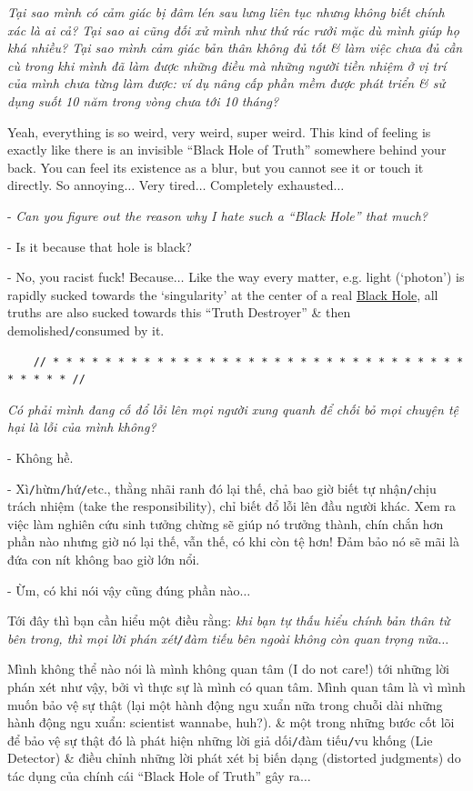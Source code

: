 \documentclass[12pt]{article}
\begin{document}
{\it Tại sao mình có cảm giác bị đâm lén sau lưng liên tục nhưng không biết chính xác là ai cả? Tại sao ai cũng đối xử mình như thứ rác rưởi mặc dù mình giúp họ khá nhiều? Tại sao mình cảm giác bản thân không đủ tốt \& làm việc chưa đủ cần cù trong khi mình đã làm được những điều mà những người tiền nhiệm ở vị trí của mình chưa từng làm được: ví dụ nâng cấp phần mềm được phát triển \& sử dụng suốt 10 năm trong vòng chưa tới 10 tháng?}

Yeah, everything is so weird, very weird, super weird. This kind of feeling is exactly like there is an invisible ``Black Hole of Truth'' somewhere behind your back. You can feel its existence as a blur, but you cannot see it or touch it directly. So annoying$\ldots$ Very tired$\ldots$ Completely exhausted$\ldots$

- {\it Can you figure out the reason why I hate such a ``Black Hole'' that much?}

- Is it because that hole is black?

- No, you racist fuck! Because$\ldots$ Like the way every matter, e.g. light (`photon') is rapidly sucked towards the `singularity' at the center of a real \href{https://en.wikipedia.org/wiki/Black_hole}{Black Hole}, all truths are also sucked towards this ``Truth Destroyer'' \& then demolished{\tt/}consumed by it.

\begin{verbatim}
	// * * * * * * * * * * * * * * * * * * * * * * * * * * * * * * * * * * * * * //
\end{verbatim}

\noindent
{} {\it Có phải mình đang cố đổ lỗi lên mọi người xung quanh để chối bỏ mọi chuyện tệ hại là lỗi của mình không?}

- Không hề.

- Xì{\tt/}hừm{\tt/}hứ{\tt/}etc., thằng nhãi ranh đó lại thế, chả bao giờ biết tự nhận{\tt/}chịu trách nhiệm (take the responsibility), chỉ biết đổ lỗi lên đầu người khác. Xem ra việc làm nghiên cứu sinh tưởng chừng sẽ giúp nó trưởng thành, chín chắn hơn phần nào nhưng giờ nó lại thế, vẫn thế, có khi còn tệ hơn! Đảm bảo nó sẽ mãi là đứa con nít không bao giờ lớn nổi.

- Ừm, có khi nói vậy cũng đúng phần nào$\ldots$

Tới đây thì bạn cần hiểu một điều rằng: {\it khi bạn tự thấu hiểu chính bản thân từ bên trong, thì mọi lời phán xét{\tt/}đàm tiếu bên ngoài không còn quan trọng nữa}$\ldots$

Mình không thể nào nói là mình không quan tâm (I do not care!) tới những lời phán xét như vậy, bởi vì thực sự là mình có quan tâm. Mình quan tâm là vì mình muốn bảo vệ sự thật (lại một hành động ngu xuẩn nữa trong chuỗi dài những hành động ngu xuẩn: scientist wannabe, huh?). \& một trong những bước cốt lõi để bảo vệ sự thật đó là phát hiện những lời giả dối{\tt/}đàm tiếu{\tt/}vu khống (Lie Detector) \& điều chỉnh những lời phát xét bị biến dạng (distorted judgments) do tác dụng của chính cái ``Black Hole of Truth'' gây ra$\ldots$
\end{document}
